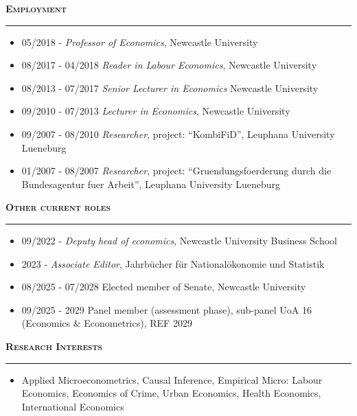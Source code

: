 \documentclass[10pt,pdftex,a4paper,oneside]{article}
\begin{document}
\textbf{\textsc{Employment}}
\vspace{.5ex}
\hrule
\begin{itemize}[noitemsep,nolistsep]
\item[] 05/2018 - \emph{Professor of Economics}, Newcastle University
\item[] 08/2017 - 04/2018  \emph{Reader in Labour Economics}, Newcastle University
\item[] 08/2013 - 07/2017 \emph{Senior Lecturer in Economics} Newcastle University
 \item[] 09/2010 - 07/2013  \emph{Lecturer in Economics}, Newcastle University
\item[] 09/2007 - 08/2010  \emph{Researcher}, project: ``KombiFiD'', Leuphana University Lueneburg
\item[] 01/2007 - 08/2007  \emph{Researcher}, project: ``Gruendungsfoerderung durch	die Bundesagentur fuer Arbeit'', Leuphana University Lueneburg
\end{itemize}


\textbf{\textsc{Other current roles}}
\vspace{.5ex}
\hrule
\begin{itemize}[noitemsep,nolistsep]
\item[] 09/2022 - \emph{Deputy head of economics}, Newcastle University Business School
\item[] 2023 - \emph{Associate Editor}, Jahrb{\"u}cher f{\"u}r National{\"o}konomie und Statistik
\item[] 08/2025 - 07/2028 Elected member of Senate, Newcastle University
\item[] 09/2025 - 2029 Panel member (assessment phase), sub-panel UoA 16 (Economics \& Econometrics), REF 2029
\end{itemize}


\textbf{\textsc{Research Interests}}
\vspace{.5ex}
\hrule
\begin{itemize}[noitemsep,nolistsep]
\item[] Applied Microeconometrics, Causal Inference, Empirical Micro: Labour Economics, Economics of Crime, Urban Economics, Health Economics, International Economics
\end{itemize}
\end{document}
